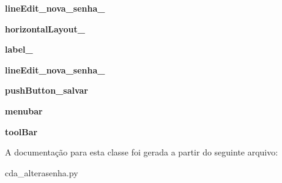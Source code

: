 \begin{DoxyCompactItemize}
\item 
\hypertarget{classcda__alterasenha_1_1Ui__Altera__Senha__Window_ac3f3e367c0d5fffc4b363dc75b482448}{{\bfseries line\-Edit\-\_\-nova\-\_\-senha\-\_}}\label{classcda__alterasenha_1_1Ui__Altera__Senha__Window_ac3f3e367c0d5fffc4b363dc75b482448}

\item 
\hypertarget{classcda__alterasenha_1_1Ui__Altera__Senha__Window_abafd6f4377a3f2312b6def98ca2e61ee}{{\bfseries horizontal\-Layout\-\_}}\label{classcda__alterasenha_1_1Ui__Altera__Senha__Window_abafd6f4377a3f2312b6def98ca2e61ee}

\item 
\hypertarget{classcda__alterasenha_1_1Ui__Altera__Senha__Window_a8d239af0855f6269464121d163a3c26a}{{\bfseries label\-\_}}\label{classcda__alterasenha_1_1Ui__Altera__Senha__Window_a8d239af0855f6269464121d163a3c26a}

\item 
\hypertarget{classcda__alterasenha_1_1Ui__Altera__Senha__Window_a817b6925215c2c491515a7a434823b0b}{{\bfseries line\-Edit\-\_\-nova\-\_\-senha\-\_}}\label{classcda__alterasenha_1_1Ui__Altera__Senha__Window_a817b6925215c2c491515a7a434823b0b}

\item 
\hypertarget{classcda__alterasenha_1_1Ui__Altera__Senha__Window_a9d3444efac48711d8be18f93617ad31e}{{\bfseries push\-Button\-\_\-salvar}}\label{classcda__alterasenha_1_1Ui__Altera__Senha__Window_a9d3444efac48711d8be18f93617ad31e}

\item 
\hypertarget{classcda__alterasenha_1_1Ui__Altera__Senha__Window_ae8de17e01b9121ed956dd598c6d30fc7}{{\bfseries menubar}}\label{classcda__alterasenha_1_1Ui__Altera__Senha__Window_ae8de17e01b9121ed956dd598c6d30fc7}

\item 
\hypertarget{classcda__alterasenha_1_1Ui__Altera__Senha__Window_aeaa2c53784bc3ab4b1974312e6c6171e}{{\bfseries tool\-Bar}}\label{classcda__alterasenha_1_1Ui__Altera__Senha__Window_aeaa2c53784bc3ab4b1974312e6c6171e}

\end{DoxyCompactItemize}


\-A documentação para esta classe foi gerada a partir do seguinte arquivo\-:\begin{DoxyCompactItemize}
\item 
cda\-\_\-alterasenha.\-py\end{DoxyCompactItemize}
